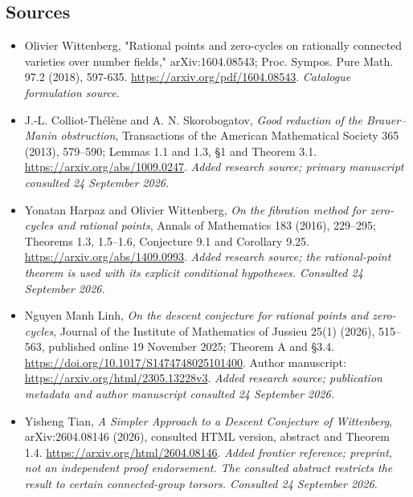 \documentclass[11pt]{article}
\begin{document}
\subsection{Sources}
\begin{itemize}\raggedright
\item[\textnormal{[S1]}]\hypertarget{source:151:1}{} Olivier Wittenberg, "Rational points and zero-cycles on rationally connected varieties over number fields," arXiv:1604.08543; Proc. Sympos. Pure Math. 97.2 (2018), 597-635.
\url{https://arxiv.org/pdf/1604.08543}.
{\small\textit{Catalogue formulation source.}}
\item[\textnormal{[E1]}]\hypertarget{extra:151:1}{} J.-L. Colliot-Th\'el\`ene and A. N. Skorobogatov, \emph{Good reduction of the Brauer--Manin obstruction}, Transactions of the American Mathematical Society 365 (2013), 579--590; Lemmas 1.1 and 1.3, \S1 and Theorem 3.1. \url{https://arxiv.org/abs/1009.0247}.
{\small\textit{Added research source; primary manuscript consulted 24 September 2026.}}
\item[\textnormal{[E2]}]\hypertarget{extra:151:2}{} Yonatan Harpaz and Olivier Wittenberg, \emph{On the fibration method for zero-cycles and rational points}, Annals of Mathematics 183 (2016), 229--295; Theorems 1.3, 1.5--1.6, Conjecture 9.1 and Corollary 9.25. \url{https://arxiv.org/abs/1409.0993}.
{\small\textit{Added research source; the rational-point theorem is used with its explicit conditional hypotheses. Consulted 24 September 2026.}}
\item[\textnormal{[E3]}]\hypertarget{extra:151:3}{} Nguyen Manh Linh, \emph{On the descent conjecture for rational points and zero-cycles}, Journal of the Institute of Mathematics of Jussieu 25(1) (2026), 515--563, published online 19 November 2025; Theorem A and \S3.4. \url{https://doi.org/10.1017/S1474748025101400}. Author manuscript: \url{https://arxiv.org/html/2305.13228v3}.
{\small\textit{Added research source; publication metadata and author manuscript consulted 24 September 2026.}}
\item[\textnormal{[E4]}]\hypertarget{extra:151:4}{} Yisheng Tian, \emph{A Simpler Approach to a Descent Conjecture of Wittenberg}, arXiv:2604.08146 (2026), consulted HTML version, abstract and Theorem 1.4. \url{https://arxiv.org/html/2604.08146}.
{\small\textit{Added frontier reference; preprint, not an independent proof endorsement. The consulted abstract restricts the result to certain connected-group torsors. Consulted 24 September 2026.}}
\end{itemize}
\end{document}
